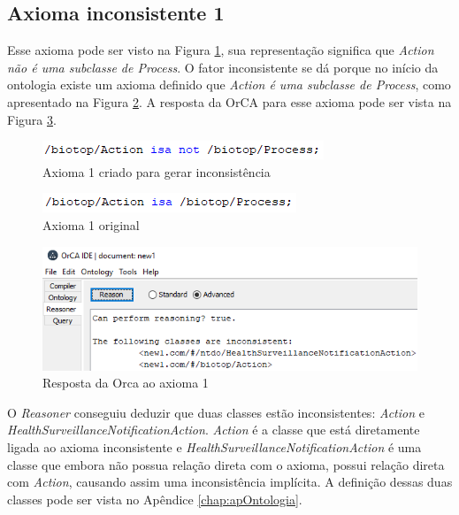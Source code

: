 \documentclass{bcc}
\begin{document}
\subsection{Axioma inconsistente 1}
Esse axioma pode ser visto na Figura \ref{fig:axiomai_1}, sua representação significa que \textit{Action não é uma subclasse de Process}. O fator inconsistente se dá porque no início da ontologia existe um axioma definido que \textit{Action é uma subclasse de Process}, como apresentado na Figura \ref{fig:axiomai_1_o}. A resposta da OrCA para esse axioma pode ser vista na Figura \ref{fig:axiomai_1_res}.

\begin{figure}[H]
\centering
\includegraphics[width=.5\textwidth]{Figuras/axiomai_1.png}
\caption{Axioma 1 criado para gerar inconsistência} 
\label{fig:axiomai_1}
\end{figure}

\begin{figure}[H]
\centering
\includegraphics[width=.5\textwidth]{Figuras/axiomai_1_o.png}
\caption{Axioma 1 original} 
\label{fig:axiomai_1_o}
\end{figure}

\begin{figure}[H]
\centering
\includegraphics[width=.6\textwidth]{Figuras/axiomai_1_res.png}
\caption{Resposta da Orca ao axioma 1} 
\label{fig:axiomai_1_res}
\end{figure}

O \textit{Reasoner} conseguiu deduzir que duas classes estão inconsistentes: \textit{Action} e \textit{HealthSurveillanceNotificationAction}. \textit{Action} é a classe que está diretamente ligada ao axioma inconsistente e \textit{HealthSurveillanceNotificationAction} é uma classe que embora não possua relação direta com o axioma, possui relação direta com \textit{Action}, causando assim uma inconsistência implícita. A definição dessas duas classes pode ser vista no Apêndice \ref{chap:apOntologia}.
\end{document}
